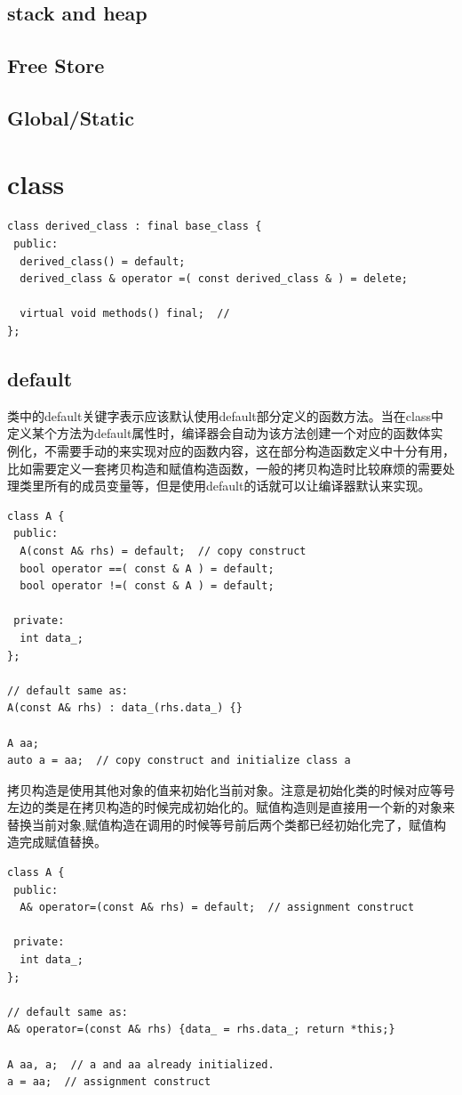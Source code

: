 \documentclass[12pt]{book}
\begin{document}
\subsection{stack and heap}
\subsection{Free Store}
\subsection{Global/Static}

\section{class}
\begin{lstlisting}
class derived_class : final base_class {
 public:
  derived_class() = default;
  derived_class & operator =( const derived_class & ) = delete;
  
  virtual void methods() final;	 //
};
\end{lstlisting}

\subsection{default}
类中的default关键字表示应该默认使用default部分定义的函数方法。当在class中定义某个方法为default属性时，编译器会自动为该方法创建一个对应的函数体实例化，不需要手动的来实现对应的函数内容，这在部分构造函数定义中十分有用，比如需要定义一套拷贝构造和赋值构造函数，一般的拷贝构造时比较麻烦的需要处理类里所有的成员变量等，但是使用default的话就可以让编译器默认来实现。
\begin{lstlisting}
class A {
 public:
  A(const A& rhs) = default;  // copy construct
  bool operator ==( const & A ) = default;
  bool operator !=( const & A ) = default;
  
 private:
  int data_;
};

// default same as:
A(const A& rhs) : data_(rhs.data_) {}

A aa;
auto a = aa;  // copy construct and initialize class a
\end{lstlisting}
拷贝构造是使用其他对象的值来初始化当前对象。注意是初始化类的时候对应等号左边的类是在拷贝构造的时候完成初始化的。赋值构造则是直接用一个新的对象来替换当前对象,赋值构造在调用的时候等号前后两个类都已经初始化完了，赋值构造完成赋值替换。
\begin{lstlisting}
class A {
 public:
  A& operator=(const A& rhs) = default;  // assignment construct

 private:
  int data_;
};
	
// default same as:
A& operator=(const A& rhs) {data_ = rhs.data_; return *this;}
	
A aa, a;  // a and aa already initialized.
a = aa;  // assignment construct
\end{lstlisting}
\end{document}
